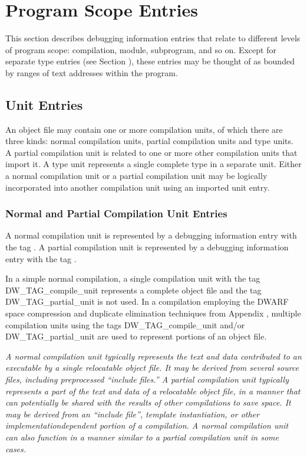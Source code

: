 \chapter{Program Scope Entries}
\label{chap:programscopeentries} 
This section describes debugging information entries that
relate to different levels of program scope: compilation,
module, subprogram, and so on. Except for separate type
entries (see Section ), 
these entries may be thought of
as bounded by ranges of text addresses within the program.

\section{Unit Entries}
An object file may contain one or more compilation units,
of which there are three kinds: normal compilation units,
partial compilation units and type units. A partial compilation
unit is related to one or more other compilation units that
import it. A type unit represents a single complete type in a
separate unit. Either a normal compilation unit or a partial
compilation unit may be logically incorporated into another
compilation unit using an imported unit entry.

\subsection[Normal and Partial CU Entries]{Normal and Partial Compilation Unit Entries}
\label{chap:normalandpartialcompilationunitentries}

A normal compilation unit is represented by a debugging
information entry with the 
tag . A partial
compilation unit is represented by a debugging information
entry with the 
tag .

In a simple normal compilation, a single compilation unit with
the tag 
DW\-\_TAG\-\_compile\-\_unit represents a complete object file
and the tag 
DW\-\_TAG\-\_partial\-\_unit is not used. 
In a compilation
employing the DWARF space compression and duplicate elimination
techniques from 
Appendix , 
multiple compilation units using
the tags 
DW\-\_TAG\-\_compile\-\_unit and/or 
DW\-\_TAG\-\_partial\-\_unit are
used to represent portions of an object file.

\textit{A normal compilation unit typically represents the text and
data contributed to an executable by a single relocatable
object file. It may be derived from several source files,
including pre\dash processed ``include files.'' A partial
compilation unit typically represents a part of the text
and data of a relocatable object file, in a manner that can
potentially be shared with the results of other compilations
to save space. It may be derived from an ``include file'',
template instantiation, or other implementation\dash dependent
portion of a compilation. A normal compilation unit can also
function in a manner similar to a partial compilation unit
in some cases.}

